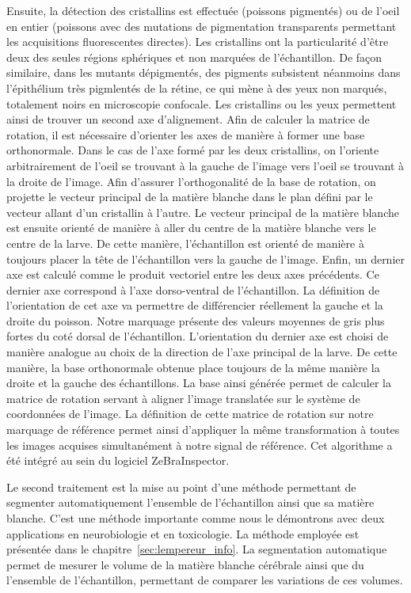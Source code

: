 \documentclass[\main/main.tex]{subfiles}
\begin{document}
%
Ensuite, la détection des cristallins est effectuée (poissons pigmentés) ou de l'oeil en entier (poissons avec des mutations de pigmentation transparents permettant les acquisitions fluorescentes directes).
%
Les cristallins ont la particularité d'être deux des seules régions sphériques et non marquées de l'échantillon.
De façon similaire, dans les mutants dépigmentés, des pigments subsistent néanmoins dans l'épithélium très pigmlentés de la rétine, ce qui mène à des yeux non marqués, totalement noirs en microscopie confocale.
%
Les cristallins ou les yeux permettent ainsi de trouver un second axe d'alignement.
%
Afin de calculer la matrice de rotation, il est nécessaire d'orienter les axes de manière à former une base orthonormale.
%
Dans le cas de l'axe formé par les deux cristallins, on l'oriente arbitrairement de l'oeil se trouvant à la gauche de l'image vers l'oeil se trouvant à la droite de l'image.
%
Afin d'assurer l'orthogonalité de la base de rotation, on projette le vecteur principal de la matière blanche dans le plan défini par le vecteur allant d'un cristallin à l'autre.
%
Le vecteur principal de la matière blanche est ensuite orienté de manière à aller du centre de la matière blanche vers le centre de la larve.
%
De cette manière, l'échantillon est orienté de manière à toujours placer la tête de l'échantillon vers la gauche de l'image.
%
Enfin, un dernier axe est calculé comme le produit vectoriel entre les deux axes précédents.
%
Ce dernier axe correspond à l'axe dorso-ventral de l'échantillon.
%
La définition de l'orientation de cet axe va permettre de différencier réellement la gauche et la droite du poisson.
%
Notre marquage présente des valeurs moyennes de gris  plus fortes du coté dorsal
de l'échantillon.
%
L'orientation du dernier axe est choisi de manière analogue
au choix de la direction de l'axe principal de la larve.
%
De cette manière, la base orthonormale obtenue place toujours de la même manière la droite et la gauche des échantillons.
%
La base ainsi générée permet de calculer la matrice de rotation servant à aligner l'image translatée sur le système de coordonnées de l'image.
%
La définition de cette matrice de rotation sur notre marquage de référence permet ainsi d'appliquer la même transformation à toutes les images acquises simultanément à notre signal de référence. Cet algorithme a été intégré au sein du logiciel ZeBraInspector.

Le second traitement est la mise au point d'une méthode permettant de segmenter automatiquement
l'ensemble de l'échantillon ainsi que sa matière blanche. C'est une méthode importante comme nous le démontrons avec deux applications en neurobiologie  et en toxicologie. 
% 
La méthode employée est présentée dans le chapitre~\ref{sec:lempereur_info}.
%
La segmentation automatique permet de mesurer le volume de la matière blanche cérébrale
ainsi que du l'ensemble de l'échantillon, permettant de comparer les variations de ces
volumes.
\end{document}
